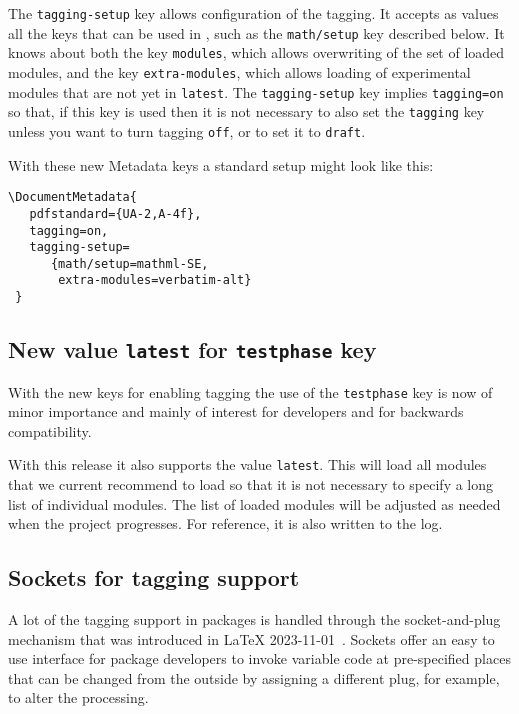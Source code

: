 \documentclass{ltnews}
\begin{document}
The \texttt{tagging-setup} key allows configuration of the tagging. It
accepts as values all the keys that can be used in ,
such as the \texttt{math/setup} key described below. It knows about both the
key \texttt{modules}, which allows overwriting of the set of loaded
modules, and the key \texttt{extra-modules}, which allows loading of
experimental modules that are not yet in \texttt{latest}. 
%
The \texttt{tagging-setup} key implies \texttt{tagging=on} so that, if
this key is used then it is not necessary to also set the \texttt{tagging}
key unless you want to turn tagging \texttt{off}, or to set it to
\texttt{draft}.

With these new Metadata keys a standard setup might look like this:
\begin{verbatim}
\DocumentMetadata{
   pdfstandard={UA-2,A-4f},
   tagging=on,
   tagging-setup=
      {math/setup=mathml-SE,
       extra-modules=verbatim-alt}
 }      
\end{verbatim}


\subsection{New value \texttt{latest} for \texttt{testphase} key}

With the new keys for enabling tagging the use of the
\texttt{testphase} key is now of minor importance and mainly of
interest for developers and for backwards compatibility.

With this release it also supports the value \texttt{latest}.  This
will load all modules that we current recommend to load so that it is not necessary to
specify a long list of individual modules. The list of loaded modules
will be adjusted as needed when the project progresses. For reference,
it is also written to the log.


\subsection{Sockets for tagging support}

A lot of the tagging support in packages is handled through the socket-and-plug 
mechanism that was introduced in \LaTeX{}
2023-11-01~\cite[p.\,93]{41:ltnews}.
%
Sockets offer an easy to use interface
for package developers to invoke variable code at pre-specified places that
can be changed from the outside by assigning a different plug, for example, to alter the processing.

\end{document}
